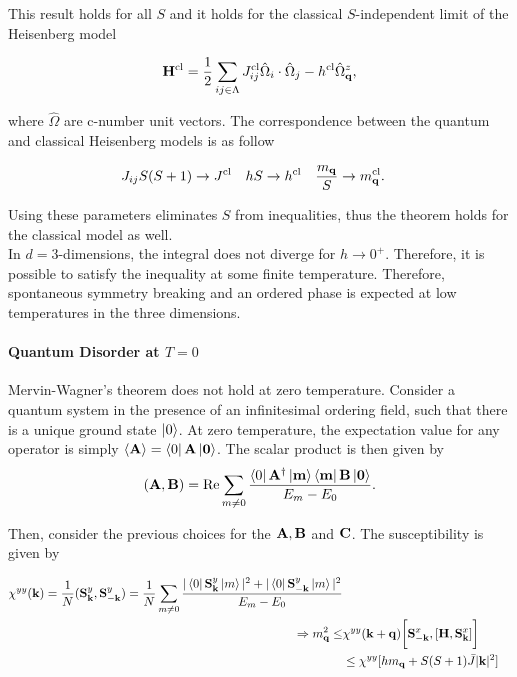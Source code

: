 \documentclass{homework}
\begin{document}
This result holds for all $S$ and it holds for the classical $S$-independent limit of the Heisenberg model 

\begin{equation}
    {\bf H}^{\textnormal{cl}} = \frac{1}{2} \sum_{ij \in \Lambda} J_{ij}^{\textnormal{cl}} \hat{\Omega}_i \cdot \hat{\Omega}_j - h^{\textnormal{cl}} \hat{\Omega}_{{\bf q}}^z,
\end{equation}

where $\hat{\Omega}$ are c-number unit vectors. The correspondence between the quantum and classical Heisenberg models is as follow 

\begin{align*}
    J_{ij} S(S+1) &\rightarrow J^{\textnormal{cl}} & hS & \rightarrow h^{\textnormal{cl}} & \frac{m_{{\bf q}}}{S} & \rightarrow m_{{\bf q}}^{\textnormal{cl}}.
\end{align*}

Using these parameters eliminates $S$ from inequalities, thus the theorem holds for the classical model as well. \\

In $d=3$-dimensions, the integral does not diverge for $h \rightarrow 0^+$. Therefore, it is possible to satisfy the inequality at some finite temperature. Therefore, spontaneous symmetry breaking and an ordered phase is expected at low temperatures in the three dimensions. \\

\paragraph{\textbf{Quantum Disorder at $T = 0$}}

Mervin-Wagner's theorem does not hold at zero temperature. Consider a quantum system in the presence of an infinitesimal ordering field, such that there is a unique ground state $\ket{0}$. At zero temperature, the expectation value for any operator is simply $\langle {\bf A} \rangle = \bra{0} {\bf A} \ket{0}$. The scalar product is then given by 
$$
    ({\bf A}, {\bf B}) = \Re \sum_{m \neq 0} \frac{\bra{0} {\bf A}^\dagger \ket{m} \bra{m} {\bf B} \ket{0}}{E_m - E_0}.
$$

Then, consider the previous choices for the ${\bf A}, {\bf B}$ and ${\bf C}$. The susceptibility is given by 

\begin{equation}
    \begin{split}
        \chi^{yy}({\bf k}) = \frac{1}{N} ({\bf S}_{{\bf k}}^y, {\bf S}_{-{\bf k}}^y) = \frac{1}{N} \sum_{m \neq 0} \frac{|\bra{0}{{\bf S}}^{y}_{{\bf k}} \ket{m}|^2 + |\bra{0}{{\bf S}}^{y}_{-{\bf k}}  \ket{m}|^2}{E_m - E_0} \\
        \Rightarrow m_{{\bf q}}^2 \leq& \chi^{yy}({\bf k+q}) \bigg[{\bf S}^x_{-{\bf k}}, [{\bf H}, {\bf S}^x_{{\bf k}}]\bigg] \\
        &\leq \chi^{yy}[h m_{\bf q} + S(S+1) \bar{J} |{\bf k}|^2]
    \end{split}
\end{equation}
\end{document}
